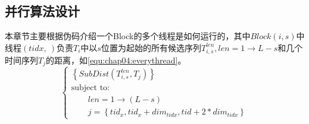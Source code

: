 





\subsection{并行算法设计}

本章节主要根据伪码介绍一个Block的多个线程是如何运行的，其中$Block(i,s)$中线程$(tidx,~)$负责$T_i$中以$s$位置为起始的所有候选序列$T_{i,s}^{len},len=1\to L-s$和几个时间序列$T_j$的距离，如\ref{equ:chap04:everythread}。
\begin{equation}\label{equ:chap04:everythread}
\left\{\begin{array}{l}
\left\lbrace SubDist(T_{i,s}^{len},T_j) \right\rbrace \\[0.1cm]
\mbox{subject to:}\\[0.1cm]
\qquad len=1\to (L-s)\\[0.1cm]
\qquad j=\left\lbrace tid_x,tid_x+dim_{tidx},tid+2*dim_{tidx}\right\rbrace 
\end{array}\right.
\end{equation}


